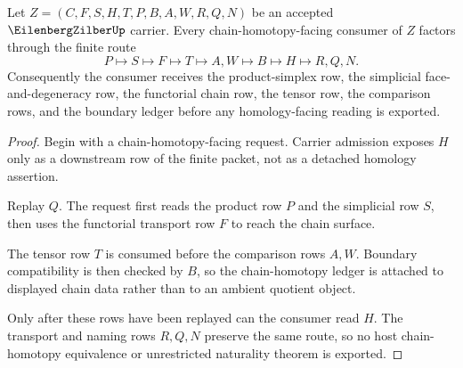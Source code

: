 \begin{theorem}
\label{thm:eilenberg-zilber-chain-homotopy-route}
Let $Z=(C,F,S,H,T,P,B,A,W,R,Q,N)$ be an accepted $\EilenbergZilberUp$ carrier. Every chain-homotopy-facing consumer of $Z$ factors through the finite route
$$
P \longmapsto S \longmapsto F \longmapsto T \longmapsto A,W \longmapsto B \longmapsto H \longmapsto R,Q,N .
$$
Consequently the consumer receives the product-simplex row, the simplicial face-and-degeneracy row, the functorial chain row, the tensor row, the comparison rows, and the boundary ledger before any homology-facing reading is exported.
\end{theorem}
\begin{proof}
Begin with a chain-homotopy-facing request. Carrier admission exposes $H$ only as a downstream row of the finite packet, not as a detached homology assertion.

Replay $Q$. The request first reads the product row $P$ and the simplicial row $S$, then uses the functorial transport row $F$ to reach the chain surface.

The tensor row $T$ is consumed before the comparison rows $A,W$. Boundary compatibility is then checked by $B$, so the chain-homotopy ledger is attached to displayed chain data rather than to an ambient quotient object.

Only after these rows have been replayed can the consumer read $H$. The transport and naming rows $R,Q,N$ preserve the same route, so no host chain-homotopy equivalence or unrestricted naturality theorem is exported.
\end{proof}




